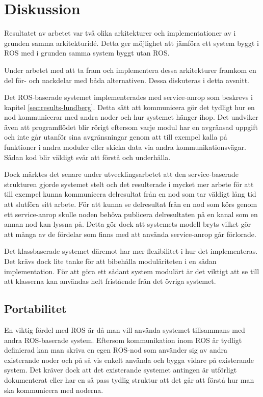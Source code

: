 \section{Diskussion}
\label{sec:discussion-lundberg}

Resultatet av arbetet var två olika arkitekturer och implementationer av i grunden samma arkitekturidé. Detta ger möjlighet att jämföra ett system byggt i ROS med i grunden samma system byggt utan ROS.

Under arbetet med att ta fram och implementera dessa arkitekturer framkom en del för- och nackdelar med båda alternativen. Dessa diskuteras i detta avsnitt.

Det ROS-baserade systemet implementerades med service-anrop som beskrevs i kapitel \ref{sec:results-lundberg}. Detta sätt att kommunicera gör det tydligt hur en nod kommunicerar med andra noder och hur systemet hänger ihop. Det undviker även att programflödet blir rörigt eftersom varje modul har en avgränsad uppgift och inte går utanför sina avgränsningar genom att till exempel kalla på funktioner i andra moduler eller skicka data via andra kommunikationsvägar. Sådan kod blir väldigt svår att förstå och underhålla.

Dock märktes det senare under utvecklingsarbetet att den service-baserade strukturen gjorde systemet stelt och det resulterade i mycket mer arbete för att till exempel kunna kommunicera delresultat från en nod som tar väldigt lång tid att slutföra sitt arbete. För att kunna se delresultat från en nod som körs genom ett service-anrop skulle noden behöva publicera delresultaten på en kanal som en annan nod kan lyssna på. Detta gör dock att systemets modell bryts vilket gör att många av de fördelar som finns med att använda service-anrop går förlorade.

Det klassbaserade systemet däremot har mer flexibilitet i hur det implementeras. Det krävs dock lite tanke för att bibehålla moduläriteten i en sådan implementation. För att göra ett sådant system modulärt är det viktigt att se till att klasserna kan användas helt fristående från det övriga systemet.

\subsection{Portabilitet}
En viktig fördel med ROS är då man vill använda systemet tillsammans med andra ROS-baserade system. Eftersom kommunikation inom ROS är tydligt definierad kan man skriva en egen ROS-nod som använder sig av andra existerande noder och på så vis enkelt använda och bygga vidare på existerande system. Det kräver dock att det existerande systemet antingen är utförligt dokumenterat eller har en så pass tydlig struktur att det går att förstå hur man ska kommunicera med noderna.


